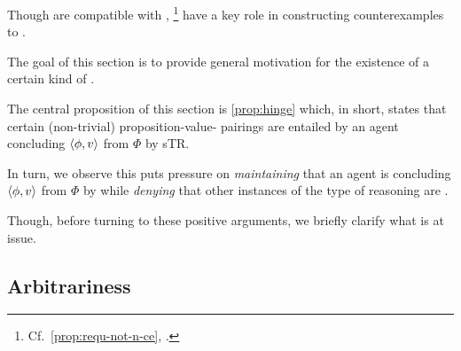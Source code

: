 \begin{note}
  Though  are compatible with \issueConstraint{},%
  \footnote{
    Cf.\ \autoref{prop:requ-not-n-ce}, .
  }
   have a key role in constructing counterexamples to \issueConstraint{}.

  The goal of this section is to provide general motivation for the existence of a certain kind of \requ{}.

  The central proposition of this section is \autoref{prop:hinge} which, in short, states that certain (non-trivial) proposition-value-\poP{} pairings are entailed by an agent concluding \(\langle \phi, v \rangle\) from \(\Phi\) by {\color{red} sTR{}}.

  In turn, we observe this puts pressure on \emph{maintaining} that an agent is concluding \(\langle \phi, v \rangle\) from \(\Phi\) by \tR{} while \emph{denying} that other instances of the type of reasoning are .

  Though, before turning to these positive arguments, we briefly clarify what is at issue.
\end{note}

\subsection{Arbitrariness}

